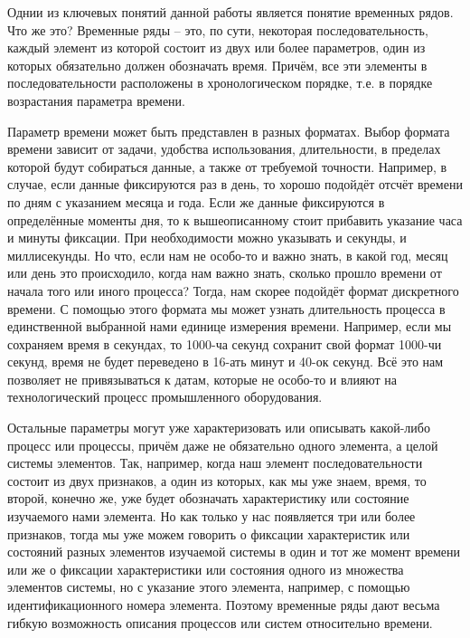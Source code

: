 {\cyrillicfont 
\fontsize{13pt}{16.25pt}\selectfont
\englishfont 

  \par \redline Однии из ключевых понятий данной работы является понятие временных рядов. Что же это? Временные ряды {--} это, по сути, некоторая последовательность, каждый элемент из которой состоит из двух или более параметров, один из которых обязательно должен обозначать время. Причём, все эти элементы в последовательности расположены в хронологическом порядке, т.е. в порядке возрастания параметра времени. 

  \par \redline Параметр времени может быть представлен в разных форматах. Выбор формата времени зависит от задачи, удобства использования, длительности, в пределах которой будут собираться данные, а также от требуемой точности. Например, в случае, если данные фиксируются раз в день, то хорошо подойдёт отсчёт времени по дням с указанием месяца и года. Если же данные фиксируются в определённые моменты дня, то к вышеописанному стоит прибавить указание часа и минуты фиксации. При необходимости можно указывать и секунды, и миллисекунды. Но что, если нам не особо-то и важно знать, в какой год, месяц или день это происходило, когда нам важно знать, сколько прошло времени от начала того или иного процесса? Тогда, нам скорее подойдёт формат дискретного времени. С помощью этого формата мы может узнать длительность процесса в единственной выбранной нами единице измерения времени. Например, если мы сохраняем время в секундах, то 1000-ча секунд сохранит свой формат 1000-чи секунд, время не будет переведено в 16-ать минут и 40-ок секунд. Всё это нам позволяет не привязываться к датам, которые не особо-то и влияют на технологический процесс промышленного оборудования.

  \par \redline Остальные параметры могут уже характеризовать или описывать какой-либо процесс или процессы, причём даже не обязательно одного элемента, а целой системы элементов. Так, например, когда наш элемент последовательности состоит из двух признаков, а один из которых, как мы уже знаем, время, то второй, конечно же, уже будет обозначать характеристику или состояние изучаемого нами элемента. Но как только у нас появляется три или более признаков, тогда мы уже можем говорить о фиксации характеристик или состояний разных элементов изучаемой системы в один и тот же момент времени или же о фиксации характеристики или состояния одного из множества элементов системы, но с указание этого элемента, например, с помощью идентификационного номера элемента. Поэтому временные ряды дают весьма гибкую возможность описания процессов или систем относительно времени. 

}
